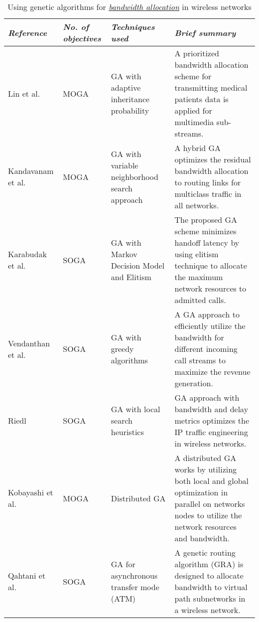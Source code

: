 \documentclass[journal]{IEEEtran}
\begin{document}
\begin{table*}
\caption{Using genetic algorithms for \textit{\underline{bandwidth allocation}} in wireless networks}
\centering

\begin{tabular}{p{2.5cm} p{1cm}p{3cm}p{10cm}}
\toprule
\textbf{\emph{Reference}}    &  \textbf{\emph{No. of \newline objectives}} &  \textbf{\emph{Techniques used}}  &  \textbf{\emph{Brief summary}} \\
\midrule

Lin et al. \cite{lin2012accelerated} & MOGA & GA with adaptive inheritance probability & A prioritized bandwidth allocation scheme for transmitting medical patients data is applied for multimedia sub-streams.\\

Kandavanam et al. \cite{kandavanam2010hybrid} & MOGA & GA with variable neighborhood search approach & A hybrid GA optimizes the residual bandwidth allocation to routing links for multiclass traffic in all networks.\\

Karabudak et al. \cite{karabudak2004call} &SOGA& GA with Markov Decision Model and Elitism& The proposed GA scheme minimizes handoff latency by using elitism technique to allocate the maximum network resources to admitted calls.\\

Vendanthan et al. \cite{vedantham1998bandwidth}& SOGA & GA with greedy algorithms & A GA approach to efficiently utilize the bandwidth for different incoming call streams to maximize the revenue generation.\\

Riedl \cite{riedl2002hybrid} &SOGA& GA with local search heuristics & GA approach with bandwidth and delay metrics optimizes the IP traffic engineering in wireless networks.\\

Kobayashi et al. \cite{kobayashi2004designing}& MOGA &Distributed GA & A distributed GA works by utilizing both local and global optimization in parallel on networks nodes to utilize the network resources and bandwidth.\\

Qahtani et al. \cite{al1998dynamic} &SOGA&GA for asynchronous transfer mode (ATM)&A genetic routing algorithm (GRA) is designed to allocate bandwidth to virtual path subnetworks in a wireless network.\\

\bottomrule
\end{tabular}
\label{tab:bandwidth}
\end{table*}
\end{document}
